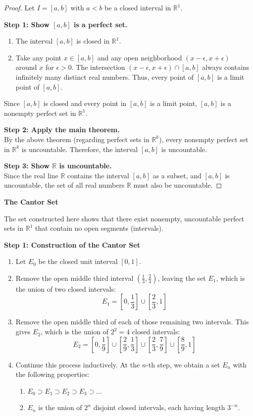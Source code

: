 \documentclass{article}
\theoremstyle{mythm}
\begin{document}
\begin{proof}
Let $I = [a, b]$ with $a < b$ be a closed interval in $\mathbb{R}^1$.

\textbf{Step 1: Show $[a, b]$ is a perfect set.}
\begin{enumerate}
    \item The interval $[a, b]$ is closed in $\mathbb{R}^1$.
    \item Take any point $x \in [a, b]$ and any open neighborhood $(x - \epsilon, x + \epsilon)$ around $x$ for $\epsilon > 0$. The intersection $(x - \epsilon, x + \epsilon) \cap [a, b]$ always contains infinitely many distinct real numbers. Thus, every point of $[a, b]$ is a limit point of $[a, b]$.
\end{enumerate}
Since $[a, b]$ is closed and every point in $[a, b]$ is a limit point, $[a, b]$ is a nonempty perfect set in $\mathbb{R}^1$.

\textbf{Step 2: Apply the main theorem.} \\
By the above theorem (regarding perfect sets in $\mathbb{R}^k$), every nonempty perfect set in $\mathbb{R}^k$ is uncountable. 
Therefore, the interval $[a, b]$ is uncountable.

\textbf{Step 3: Show $\mathbb{R}$ is uncountable.} \\
Since the real line $\mathbb{R}$ contains the interval $[a, b]$ as a subset, and $[a, b]$ is uncountable, the set of all real numbers $\mathbb{R}$ must also be uncountable.
\end{proof}
\textbf{The Cantor Set}

The set constructed here shows that there exist nonempty, uncountable perfect sets in $\mathbb{R}^1$ that contain no open segments (intervals).

\textbf{Step 1: Construction of the Cantor Set}
\begin{enumerate}
    \item Let $E_0$ be the closed unit interval $[0, 1]$.
    \item Remove the open middle third interval $\left(\frac{1}{3}, \frac{2}{3}\right)$, leaving the set $E_1$, which is the union of two closed intervals:
    \[ E_1 = \left[0, \frac{1}{3}\right] \cup \left[\frac{2}{3}, 1\right] \]
    \item Remove the open middle third of each of those remaining two intervals. This gives $E_2$, which is the union of $2^2 = 4$ closed intervals:
    \[ E_2 = \left[0, \frac{1}{9}\right] \cup \left[\frac{2}{9}, \frac{1}{3}\right] \cup \left[\frac{2}{3}, \frac{7}{9}\right] \cup \left[\frac{8}{9}, 1\right] \]
    \item Continue this process inductively. At the $n$-th step, we obtain a set $E_n$ with the following properties:
    \begin{enumerate}[label=(\alph*)]
        \item $E_0 \supset E_1 \supset E_2 \supset E_3 \supset \dots$
        \item $E_n$ is the union of $2^n$ disjoint closed intervals, each having length $3^{-n}$.
    \end{enumerate}
\end{enumerate}
\end{document}
